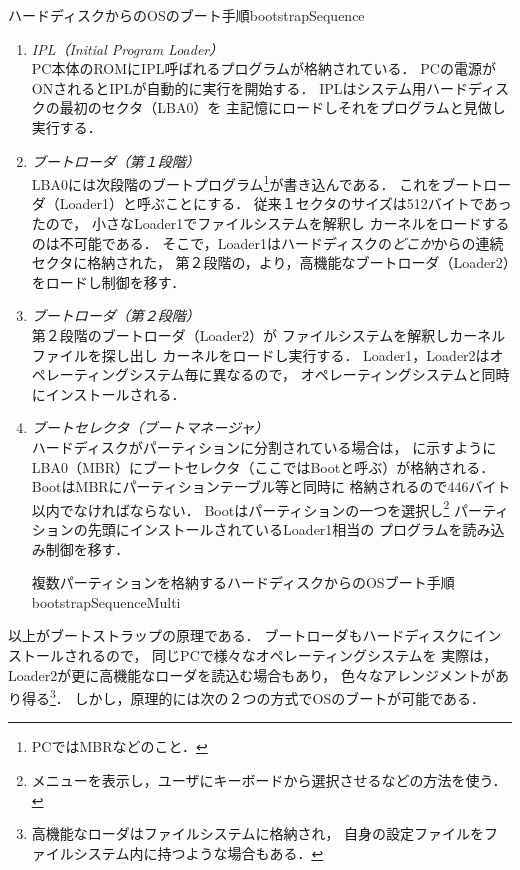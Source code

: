            {ハードディスクからのOSのブート手順}{bootstrapSequence}

\begin{enumerate}
\item \emph{IPL（Initial Program Loader）} \\
  PC本体のROMにIPL呼ばれるプログラムが格納されている．
  PCの電源がONされるとIPLが自動的に実行を開始する．
  IPLはシステム用ハードディスクの最初のセクタ（LBA0）を
  主記憶にロードしそれをプログラムと見做し実行する．
\item \emph{ブートローダ（第１段階）} \\
  LBA0には次段階のブートプログラム\footnote{
    PCではMBRなどのこと．}が書き込んである．
  これをブートローダ（Loader1）と呼ぶことにする．
  従来１セクタのサイズは512バイトであったので，
  小さなLoader1でファイルシステムを解釈し
  カーネルをロードするのは不可能である．
  そこで，Loader1はハードディスクの\emph{どこか}からの連続セクタに格納された，
  第２段階の，より，高機能なブートローダ（Loader2）をロードし制御を移す．
\item \emph{ブートローダ（第２段階）} \\
  第２段階のブートローダ（Loader2）が
  ファイルシステムを解釈しカーネルファイルを探し出し
  カーネルをロードし実行する．
  Loader1，Loader2はオペレーティングシステム毎に異なるので，
  オペレーティングシステムと同時にインストールされる．
\item  \emph{ブートセレクタ（ブートマネージャ）} \\
  ハードディスクがパーティションに分割されている場合は，
  に示すように
  LBA0（MBR）にブートセレクタ（ここではBootと呼ぶ）が格納される．
  BootはMBRにパーティションテーブル等と同時に
  格納されるので446バイト以内でなければならない．
  Bootはパーティションの一つを選択し\footnote{
    メニューを表示し，ユーザにキーボードから選択させるなどの方法を使う．}
  パーティションの先頭にインストールされているLoader1相当の
  プログラムを読み込み制御を移す．

           {複数パーティションを格納するハードディスクからのOSブート手順}
           {bootstrapSequenceMulti}

\end{enumerate}

以上がブートストラップの原理である．
ブートローダもハードディスクにインストールされるので，
同じPCで様々なオペレーティングシステムを
実際は，Loader2が更に高機能なローダを読込む場合もあり，
色々なアレンジメントがあり得る\footnote{
高機能なローダはファイルシステムに格納され，
自身の設定ファイルをファイルシステム内に持つような場合もある．}．
しかし，原理的には次の２つの方式でOSのブートが可能である．

